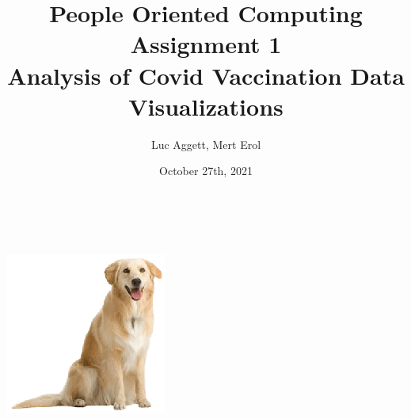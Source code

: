 \title{\large People Oriented Computing Assignment 1\\[0.5cm]
        \bf\Large Analysis of Covid Vaccination Data Visualizations}
\author{\large Luc Aggett, Mert Erol}
\date{October 27th, 2021}
\makeatletter
    \begin{titlepage}
        \begin{center}
        \vbox{}\vspace{5cm}
            {\@title }\\[3cm] 
            {\@author}\\
            \vfill \includegraphics[scale=0.3]{images/logo.png}\\[1cm]
            {\@date}
        \end{center}
    \end{titlepage}
\makeatother
